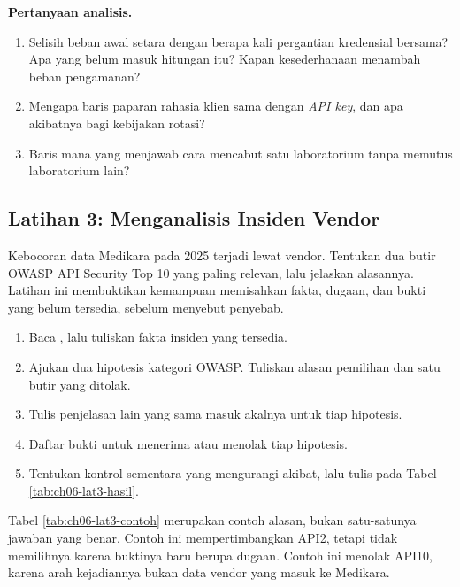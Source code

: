 \textbf{Pertanyaan analisis.}
\begin{enumerate}
  \item Selisih beban awal setara dengan berapa kali pergantian kredensial bersama? Apa yang belum masuk hitungan itu? Kapan kesederhanaan menambah beban pengamanan?
  \item Mengapa baris paparan rahasia klien sama dengan \textit{API key}, dan apa akibatnya bagi kebijakan rotasi?
  \item Baris mana yang menjawab cara mencabut satu laboratorium tanpa memutus laboratorium lain?
\end{enumerate}

\subsection*{Latihan 3: Menganalisis Insiden Vendor}

Kebocoran data Medikara pada 2025 terjadi lewat vendor. Tentukan dua butir OWASP API Security Top 10 yang paling relevan, lalu jelaskan alasannya. Latihan ini membuktikan
kemampuan memisahkan fakta, dugaan, dan bukti yang belum tersedia, sebelum menyebut penyebab.

\begin{enumerate}
  \item Baca , lalu tuliskan fakta insiden yang tersedia.
  \item Ajukan dua hipotesis kategori OWASP. Tuliskan alasan pemilihan dan satu butir yang ditolak.
  \item Tulis penjelasan lain yang sama masuk akalnya untuk tiap hipotesis.
  \item Daftar bukti untuk menerima atau menolak tiap hipotesis.
  \item Tentukan kontrol sementara yang mengurangi akibat, lalu tulis pada Tabel \ref{tab:ch06-lat3-hasil}.
\end{enumerate}

Tabel \ref{tab:ch06-lat3-contoh} merupakan contoh alasan, bukan satu-satunya jawaban yang benar. Contoh ini mempertimbangkan API2, tetapi tidak memilihnya karena buktinya
baru berupa dugaan. Contoh ini menolak API10, karena arah kejadiannya bukan data vendor yang masuk ke Medikara.

